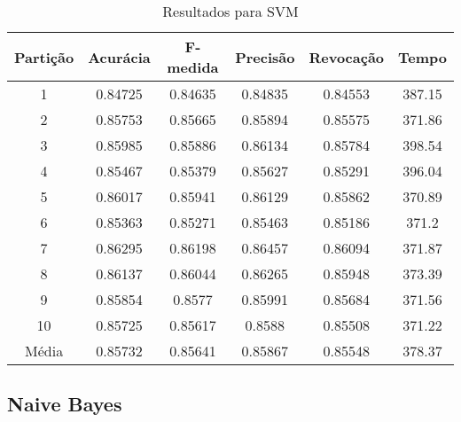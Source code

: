\begin{table}[h]
\centering
\caption{Resultados para SVM}
\vspace{0.2cm}
\begin{tabular}{c|c|c|c|c|c}
Partição & Acurácia & F-medida & Precisão & Revocação & Tempo \\
\hline
1  & 0.84725 & 0.84635 & 0.84835 & 0.84553 & 387.15 \\ 
2  & 0.85753 & 0.85665 & 0.85894 & 0.85575 & 371.86 \\
3  & 0.85985 & 0.85886 & 0.86134 & 0.85784 & 398.54 \\
4  & 0.85467 & 0.85379 & 0.85627 & 0.85291 & 396.04 \\
5  & 0.86017 & 0.85941 & 0.86129 & 0.85862 & 370.89 \\
6  & 0.85363 & 0.85271 & 0.85463 & 0.85186 & 371.2  \\
7  & 0.86295 & 0.86198 & 0.86457 & 0.86094 & 371.87 \\
8  & 0.86137 & 0.86044 & 0.86265 & 0.85948 & 373.39 \\
9  & 0.85854 &  0.8577 & 0.85991 & 0.85684 & 371.56 \\
10 & 0.85725 & 0.85617 & 0.8588  & 0.85508 & 371.22 \\
\hline
Média & 0.85732 & 0.85641 & 0.85867 & 0.85548 & 378.37 \\

\end{tabular} 
\label{table:resultadosSVM}
\end{table}

\subsection{Naive Bayes}

